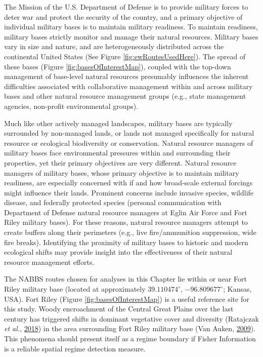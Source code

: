 \documentclass[12pt,twoside,openany]{reedthesis}
\begin{document}
The Mission of the U.S. Department of Defense is to provide military forces to deter war and protect the security of the country, and a primary objective of individual military bases is to maintain military readiness. To maintain readiness, military bases strictly monitor and manage their natural resources. Military bases vary in size and nature, and are heterogeneously distributed across the continental United States (See Figure \ref{fig:ewRoutesUsedHere}). The spread of these bases (Figure \ref{fig:basesOfInterestMap}), coupled with the top-down management of base-level natural resources presumably influences the inherent difficulties associated with collaborative management within and across military bases and other natural resource management groups (e.g., state management agencies, non-profit environmental groups).

Much like other actively managed landscapes, military bases are typically surrounded by non-managed lands, or lands not managed specifically for natural resource or ecological biodiversity or conservation. Natural resource managers of military bases face environmental pressures within and surrounding their properties, yet their primary objectives are very different. Natural resource managers of military bases, whose primary objective is to maintain military readiness, are especially concerned with if and how broad-scale external forcings might influence their lands. Prominent concerns include invasive species, wildlife disease, and federally protected species (personal communication with Department of Defense natural resource managers at Eglin Air Force and Fort Riley military bases). For these reasons, natural resource managers attempt to create buffers along their perimeters (e.g., live fire/ammunition suppression, wide fire breaks). Identifying the proximity of military bases to historic and modern ecological shifts may provide insight into the effectiveness of their natural resource management efforts.

The NABBS routes chosen for analyses in this Chapter lie within or near Fort Riley military base (located at approximately \(39.110474^{\circ}\), \(-96.809677^{\circ}\); Kansas, USA). Fort Riley (Figure \ref{fig:basesOfInterestMap}) is a useful reference site for this study. Woody encroachment of the Central Great Plains over the last century has triggered shifts in dominant vegetative cover and diversity (Ratajczak \emph{et al.}, \protect\hyperlink{ref-ratajczak2018abrupt}{2018}) in the area surrounding Fort Riley military base (Van Auken, \protect\hyperlink{ref-van2009causes}{2009}). This phenomena should present itself as a regime boundary if Fisher Information is a reliable spatial regime detection measure.
\end{document}
